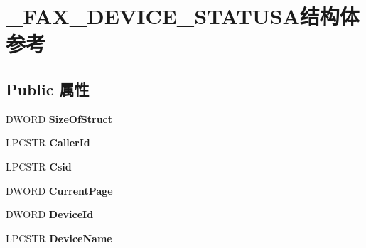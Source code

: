\hypertarget{struct___f_a_x___d_e_v_i_c_e___s_t_a_t_u_s_a}{}\section{\+\_\+\+F\+A\+X\+\_\+\+D\+E\+V\+I\+C\+E\+\_\+\+S\+T\+A\+T\+U\+S\+A结构体 参考}
\label{struct___f_a_x___d_e_v_i_c_e___s_t_a_t_u_s_a}
\subsection*{Public 属性}
\begin{DoxyCompactItemize}
\item 
\mbox{\label{struct___f_a_x___d_e_v_i_c_e___s_t_a_t_u_s_a_a997dea5ea0a66ca3b58764e353701bc2}} 
D\+W\+O\+RD {\bfseries Size\+Of\+Struct}
\item 
\mbox{\label{struct___f_a_x___d_e_v_i_c_e___s_t_a_t_u_s_a_a0be0eb4dd96fb87033d62c7dab338eed}} 
L\+P\+C\+S\+TR {\bfseries Caller\+Id}
\item 
\mbox{\label{struct___f_a_x___d_e_v_i_c_e___s_t_a_t_u_s_a_aa83fd323691428edc5e699b3124532d1}} 
L\+P\+C\+S\+TR {\bfseries Csid}
\item 
\mbox{\label{struct___f_a_x___d_e_v_i_c_e___s_t_a_t_u_s_a_a7eff90dc4f9becf5435c72da1d26eadd}} 
D\+W\+O\+RD {\bfseries Current\+Page}
\item 
\mbox{\label{struct___f_a_x___d_e_v_i_c_e___s_t_a_t_u_s_a_ad9fd7646a4c780ae8091d6751b6d2d11}} 
D\+W\+O\+RD {\bfseries Device\+Id}
\item 
\mbox{\label{struct___f_a_x___d_e_v_i_c_e___s_t_a_t_u_s_a_a2515405a25c1149ee363dfc2c040205a}} 
L\+P\+C\+S\+TR {\bfseries Device\+Name}
\item 
\mbox{\label{struct___f_a_x___d_e_v_i_c_e___s_t_a_t_u_s_a_a1f8a9c1a7524c04dc1a9fc68b41428f5}} 

\end{DoxyCompactItemize}

